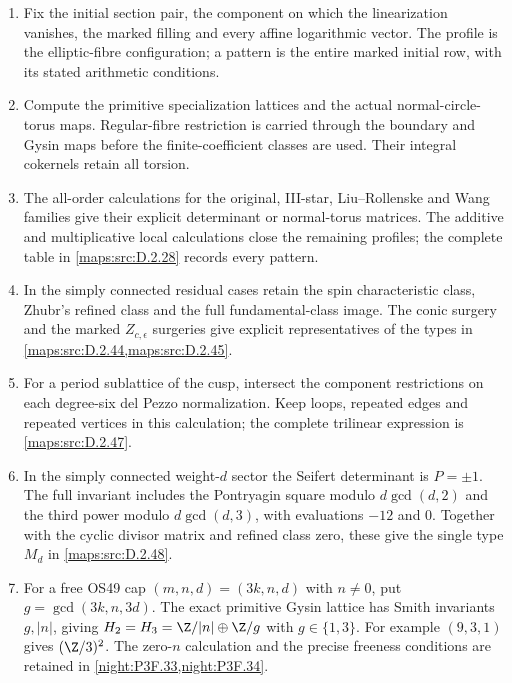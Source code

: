 \begin{enumerate}[label=\arabic*.,leftmargin=*]
\item Fix the initial section pair, the component on which the
linearization vanishes, the marked filling and every affine
logarithmic vector.  The profile is the elliptic-fibre configuration;
a pattern is the entire marked initial row, with its stated
arithmetic conditions.
\item Compute the primitive specialization lattices and the actual
normal-circle-torus maps.  Regular-fibre restriction is carried
through the boundary and Gysin maps before the finite-coefficient
classes are used.  Their integral cokernels retain all torsion.
\item The all-order calculations for the original, III-star,
Liu--Rollenske and Wang families give their explicit determinant
or normal-torus matrices.  The additive and multiplicative local
calculations close the remaining profiles; the complete table in
\cref{maps:src:D.2.28} records every pattern.
\item In the simply connected residual cases retain the spin
characteristic class, Zhubr's refined class and the full
fundamental-class image.  The conic surgery and the marked
$Z_{c,\epsilon}$ surgeries give explicit representatives of the
types in \cref{maps:src:D.2.44,maps:src:D.2.45}.
\item For a period sublattice of the cusp, intersect the component
restrictions on each degree-six del Pezzo normalization.  Keep
loops, repeated edges and repeated vertices in this calculation;
the complete trilinear expression is
\cref{maps:src:D.2.47}.
\item In the simply connected weight-$d$ sector the Seifert
determinant is $P=\pm1$.  The full invariant includes the
Pontryagin square modulo $d\gcd(d,2)$ and the third power
modulo $d\gcd(d,3)$, with evaluations $-12$ and $0$.
Together with the cyclic divisor matrix and refined class zero,
these give the single type $M_d$ in \cref{maps:src:D.2.48}.
\item For a free OS49 cap $(m,n,d)=(3k,n,d)$ with $n\ne0$,
put $g=\gcd(3k,n,3d)$.  The exact primitive Gysin lattice has
Smith invariants $g,|n|$, giving
$H_2=H_3=\Z/|n|\oplus\Z/g$ with $g\in\{1,3\}$.
For example $(9,3,1)$ gives $(\Z/3)^2$.
The zero-$n$ calculation and the precise freeness conditions are
retained in \cref{night:P3F.33,night:P3F.34}.
\end{enumerate}

